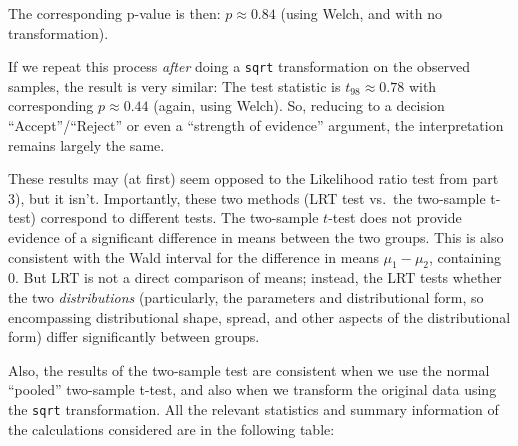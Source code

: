 \documentclass[
]{article}
\begin{document}
The corresponding p-value is then: \(p\approx 0.84\) (using Welch, and
with no transformation).

If we repeat this process \emph{after} doing a \texttt{sqrt}
transformation on the observed samples, the result is very similar: The
test statistic is \(t_{98} \approx 0.78\) with corresponding
\(p \approx 0.44\) (again, using Welch). So, reducing to a decision
``Accept''/``Reject'' or even a ``strength of evidence'' argument, the
interpretation remains largely the same.

These results may (at first) seem opposed to the Likelihood ratio test
from part 3), but it isn't. Importantly, these two methods (LRT test
vs.~the two-sample t-test) correspond to different tests. The two-sample
\(t\)-test does not provide evidence of a significant difference in
means between the two groups. This is also consistent with the Wald
interval for the difference in means \(\mu_1-\mu_2\), containing 0. But
LRT is not a direct comparison of means; instead, the LRT tests whether
the two \emph{distributions} (particularly, the parameters and
distributional form, so encompassing distributional shape, spread, and
other aspects of the distributional form) differ significantly between
groups.

Also, the results of the two-sample test are consistent when we use the
normal ``pooled'' two-sample t-test, and also when we transform the
original data using the \texttt{sqrt} transformation. All the relevant
statistics and summary information of the calculations considered are in
the following table:
\end{document}
